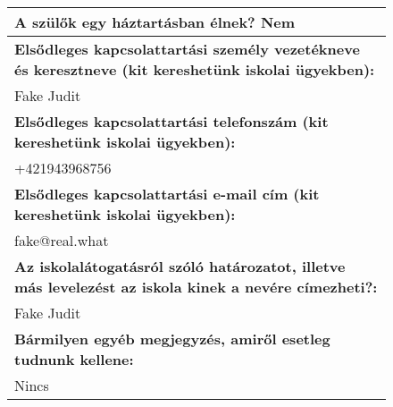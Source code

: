 \documentclass[10pt,a4paper]{article}
\begin{document}
\begin{figure}[!ht]
\begin{tabular}{|m{\textwidth}|}
\hline\vspace{3pt}
\textbf{A szülők egy háztartásban élnek? } \hspace{0.5cm} Nem \vspace{3pt} \\
\hline\vspace{3pt}
\textbf{Elsődleges kapcsolattartási személy vezetékneve és keresztneve (kit kereshetünk iskolai ügyekben):} \\ \hspace{0.5cm} Fake Judit \vspace{3pt} \\
\hline\vspace{3pt}
\textbf{Elsődleges kapcsolattartási telefonszám (kit kereshetünk iskolai ügyekben):} \\ \hspace{0.5cm} +421943968756 \vspace{3pt} \\
\hline\vspace{3pt}
\textbf{Elsődleges kapcsolattartási e-mail cím (kit kereshetünk iskolai ügyekben):} \\ \hspace{0.5cm} fake@real.what \vspace{3pt} \\
\hline\vspace{3pt}
\textbf{Az iskolalátogatásról szóló határozatot, illetve más levelezést az iskola kinek a nevére címezheti?:} \\ \hspace{0.5cm} Fake Judit \vspace{3pt} \\
\hline\vspace{3pt}
\textbf{Bármilyen egyéb megjegyzés, amiről esetleg tudnunk kellene:} \\ \hspace{0.5cm} Nincs \vspace{3pt} \\


\end{tabular}
\end{figure}
\end{document}
